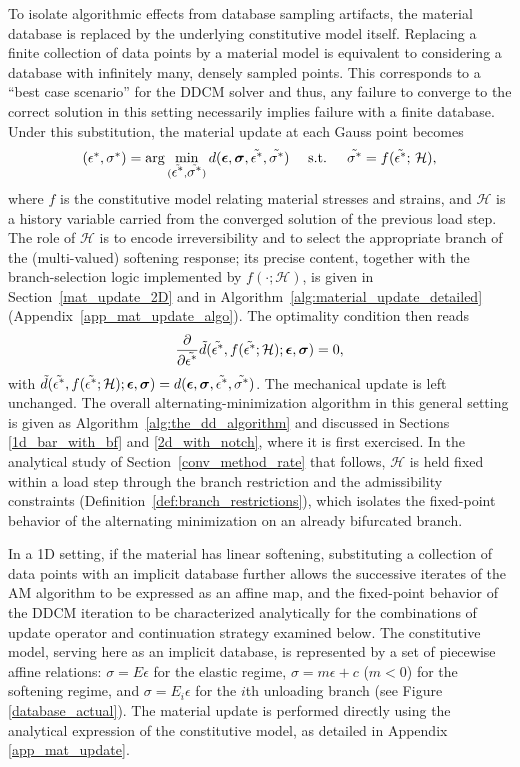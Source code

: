 \documentclass[10pt]{cas-sc}
\newenvironment{addedblock}
{\begingroup\color{blue!80}}
{\endgroup}
\begin{document}
\begin{addedblock}
To isolate algorithmic effects from database sampling artifacts, the material database is replaced by the underlying constitutive model itself. Replacing a finite collection of data points by a material model is equivalent to considering a database with infinitely many, densely sampled points. This corresponds to a ``best case scenario'' for the DDCM solver and thus, any failure to converge to the correct solution in this setting necessarily implies failure with a finite database. Under this substitution, the material update at each Gauss point becomes
\begin{equation}
	(\mbox{$\epsilon^*$},\mbox{$\sigma^*$}) = \arg \min_{(\tilde{\mbox{$\epsilon^*$}},\tilde{\mbox{$\sigma^*$}})} d(\mbox{\boldmath $\epsilon$},\mbox{\boldmath $\sigma$},\tilde{\mbox{$\epsilon^*$}},\tilde{\mbox{$\sigma^*$}}) \quad \text{   s.t.   }\quad \tilde{\mbox{$\sigma^*$}}=f(\tilde{\mbox{$\epsilon^*$}};\,\mathcal{H}),
\end{equation}
where $f$ is the constitutive model relating material stresses and strains, and $\mathcal{H}$ is a history variable carried from the converged solution of the previous load step. The role of $\mathcal{H}$ is to encode irreversibility and to select the appropriate branch of the (multi-valued) softening response; its precise content, together with the branch-selection logic implemented by $f(\cdot;\mathcal{H})$, is given in Section~\ref{mat_update_2D} and in Algorithm~\ref{alg:material_update_detailed} (Appendix~\ref{app_mat_update_algo}). The optimality condition then reads
\begin{equation}
	{\dfrac{\partial }{\partial \tilde{ \mbox{$\epsilon^*$}}}} \tilde{d}(\tilde{\mbox{$\epsilon^*$}},f(\tilde{\mbox{$\epsilon^*$}};\mathcal{H});\mbox{\boldmath $\epsilon$},\mbox{\boldmath $\sigma$})    =0,
\end{equation}
with $\tilde{d}(\tilde{\mbox{$\epsilon^*$}},f(\tilde{\mbox{$\epsilon^*$}};\mathcal{H});\mbox{\boldmath $\epsilon$},\mbox{\boldmath $\sigma$}) = d(\mbox{\boldmath $\epsilon$},\mbox{\boldmath $\sigma$},\tilde{\mbox{$\epsilon^*$}},\tilde{\mbox{$\sigma^*$}})$. The mechanical update is left unchanged. The overall alternating-minimization algorithm in this general setting is given as Algorithm~\ref{alg:the_dd_algorithm} and discussed in Sections \ref{1d_bar_with_bf} and \ref{2d_with_notch}, where it is first exercised. In the analytical study of Section~\ref{conv_method_rate} that follows, $\mathcal{H}$ is held fixed within a load step through the branch restriction and the admissibility constraints (Definition~\ref{def:branch_restrictions}), which isolates the fixed-point behavior of the alternating minimization on an already bifurcated branch.


In a 1D setting, if the material has linear softening, substituting a collection of data points with an implicit database further allows the successive iterates of the AM algorithm to be expressed as an affine map, and the fixed-point behavior of the DDCM iteration to be characterized analytically for the combinations of update operator and continuation strategy examined below. The constitutive model, serving here as an implicit database, is represented by a set of piecewise affine relations: $\sigma = E\epsilon$ for the elastic regime, $\sigma = m\epsilon + c$ ($m<0$) for the softening regime, and $\sigma = E_i \epsilon$ for the $i$th unloading branch (see Figure \ref{database_actual}). The material update is performed directly using the analytical expression of the constitutive model, as detailed in Appendix \ref{app_mat_update}. 


\end{addedblock}
\end{document}

